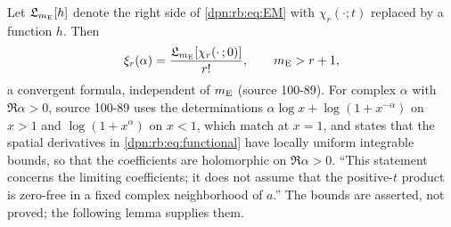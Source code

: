 \documentclass[11pt]{article}
\numberwithin{equation}{section}
\theoremstyle{definition}\newtheorem{definition}[theorem]{Definition}
\theoremstyle{remark}\newtheorem{remark}[theorem]{Remark}
\newcommand{\src}[1]{\textup{(source #1)}}
\begin{document}
Let $\mathfrak L_{m_{\rm E}}[h]$ denote the right side of \eqref{dpn:rb:eq:EM}
with $\chi_r(\cdot;t)$ replaced by a function $h$.  Then
\begin{equation}\label{dpn:rb:eq:functional}
 \xi_r(\alpha)=\frac{\mathfrak L_{m_{\rm E}}[\chi_r(\cdot\,;0)]}{r!},\qquad
 m_{\rm E}>r+1,
\end{equation}
a convergent formula, independent of $m_{\rm E}$ \src{100-89}.  For complex
$\alpha$ with $\Re\alpha>0$, source 100-89 uses the determinations
$\alpha\log x+\log(1+x^{-\alpha})$ on $x>1$ and $\log(1+x^\alpha)$ on $x<1$,
which match at $x=1$, and states that the spatial derivatives in
\eqref{dpn:rb:eq:functional} have locally uniform integrable bounds, so that
the coefficients are holomorphic on $\Re\alpha>0$.  ``This statement
concerns the limiting coefficients; it does not assume that the
positive-$t$ product is zero-free in a fixed complex neighborhood of $a$.''
The bounds are asserted, not proved; the following lemma supplies them.
\end{document}
